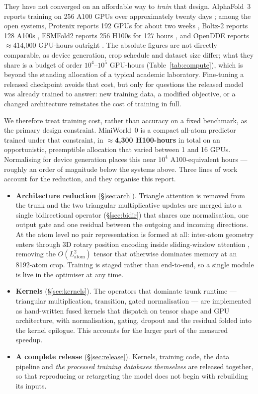 \documentclass[11pt]{article}
\newcommand{\mw}{MiniWorld~0}
\begin{document}
They have not converged on an affordable way to \emph{train} that design.
AlphaFold~3 reports training on 256 A100 GPUs over approximately twenty days
\citep{af3}; among the open systems, Protenix reports 192 GPUs for about two
weeks \citep{protenix}, Boltz-2 reports 128 A100s \citep{boltz2}, ESMFold2
reports 256 H100s for 127 hours \citep{esmfold2}, and OpenDDE reports
$\approx$414{,}000 GPU-hours outright \citep{opendde}. The absolute figures are
not directly comparable, as device generation, crop schedule and dataset size
differ; what they share is a budget of order $10^{4}$--$10^{5}$ GPU-hours
(Table~\ref{tab:compute}), which is beyond the standing allocation of a typical
academic laboratory. Fine-tuning a released checkpoint avoids that cost, but
only for questions the released model was already trained to answer: new
training data, a modified objective, or a changed architecture reinstates the
cost of training in full.

We therefore treat training cost, rather than accuracy on a fixed benchmark, as
the primary design constraint. \mw{} is a compact all-atom predictor trained
under that constraint, in $\approx$\textbf{4{,}300 H100-hours} in total on an
opportunistic, preemptible allocation that varied between 1 and 16 GPUs.
Normalising for device generation places this near $10^{4}$ A100-equivalent
hours --- roughly an order of magnitude below the systems above. Three lines of
work account for the reduction, and they organise this report.

\begin{itemize}
  \item \textbf{Architecture reduction} (\S\ref{sec:arch}). Triangle attention
        is removed from the trunk and the two triangular multiplicative updates
        are merged into a single bidirectional operator
        (\S\ref{sec:bidir}) that shares one normalisation, one output gate and
        one residual between the outgoing and incoming directions. At the atom
        level no pair representation is formed at all: inter-atom geometry
        enters through 3D rotary position encoding inside sliding-window
        attention \citep[Alg.~6--9]{esmfold2}, removing the
        $O(L_{\mathrm{atom}}^{2})$ tensor that otherwise dominates memory at an
        8192-atom crop. Training is staged rather than end-to-end, so a single
        module is live in the optimiser at any time.
  \item \textbf{Kernels} (\S\ref{sec:kernels}). The operators that dominate
        trunk runtime --- triangular multiplication, transition, gated
        normalisation --- are implemented as hand-written fused kernels that
        dispatch on tensor shape and GPU architecture, with normalisation,
        gating, dropout and the residual folded into the kernel epilogue. This
        accounts for the larger part of the measured speedup.
  \item \textbf{A complete release} (\S\ref{sec:release}). Kernels, training
        code, the data pipeline and \emph{the processed training databases
        themselves} are released together, so that reproducing or retargeting
        the model does not begin with rebuilding its inputs.
\end{itemize}
\end{document}
